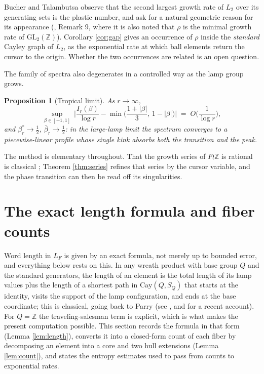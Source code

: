 \documentclass[11pt]{amsart}
\newtheorem{proposition}[theorem]{Proposition}
\theoremstyle{definition}
\theoremstyle{remark}
\newcommand{\Z}{\mathbb{Z}}
\begin{document}
Bucher and Talambutsa observe that the second largest growth rate of $L_2$ over its generating sets is the plastic number, and ask for a natural geometric reason for its appearance (\cite{BT17}, Remark 9, where it is also noted that $\rho$ is the minimal growth rate of $\mathrm{GL}_2(\Z)$). Corollary \ref{cor:gap} gives an occurrence of $\rho$ inside the \emph{standard} Cayley graph of $L_2$, as the exponential rate at which ball elements return the cursor to the origin. Whether the two occurrences are related is an open question.

The family of spectra also degenerates in a controlled way as the lamp group grows.

\begin{proposition}[Tropical limit]\label{prop:tropical}
As $r\to\infty$,
\[
\sup_{\beta\in[-1,1]}\ \Big|\frac{I_r(\beta)}{\log r}-\min\Big(\frac{1+|\beta|}{3},\,1-|\beta|\Big)\Big|\;=\;O\Big(\frac1{\log r}\Big),
\]
and $\beta^{*}_r\to\tfrac12$, $\bar\beta_r\to\tfrac12$: in the large-lamp limit the spectrum converges to a piecewise-linear profile whose single kink absorbs both the transition and the peak.
\end{proposition}

The method is elementary throughout. That the growth series of $F\wr\Z$ is rational is classical \cite{Parry92,Bartholdi17}; Theorem \ref{thm:series} refines that series by the cursor variable, and the phase transition can then be read off its singularities.

\section{The exact length formula and fiber counts}\label{sec:exact}

Word length in $L_F$ is given by an exact formula, not merely up to bounded error, and everything below rests on this. In any wreath product with base group $Q$ and the standard generators, the length of an element is the total length of its lamp values plus the length of a shortest path in $\mathrm{Cay}(Q,S_Q)$ that starts at the identity, visits the support of the lamp configuration, and ends at the base coordinate; this is classical, going back to Parry \cite{Parry92} (see \cite{Bartholdi17}, and \cite{Bodart22} for a recent account). For $Q=\Z$ the traveling-salesman term is explicit, which is what makes the present computation possible. This section records the formula in that form (Lemma \ref{lem:length}), converts it into a closed-form count of each fiber by decomposing an element into a core and two hull extensions (Lemma \ref{lem:count}), and states the entropy estimates used to pass from counts to exponential rates.
\end{document}
